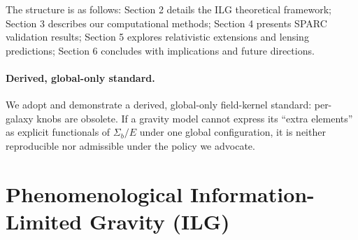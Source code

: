 \documentclass[fleqn,usenatbib]{mnras}
\begin{document}
The structure is as follows: Section 2 details the ILG theoretical framework; Section 3 describes our computational methods; Section 4 presents SPARC validation results; Section 5 explores relativistic extensions and lensing predictions; Section 6 concludes with implications and future directions.

\paragraph{Derived, global-only standard.} We adopt and demonstrate a derived, global-only field-kernel standard: per-galaxy knobs are obsolete. If a gravity model cannot express its “extra elements” as explicit functionals of $\Sigma_b/E$ under one global configuration, it is neither reproducible nor admissible under the policy we advocate.


\section{Phenomenological Information-Limited Gravity (ILG)}
\end{document}
